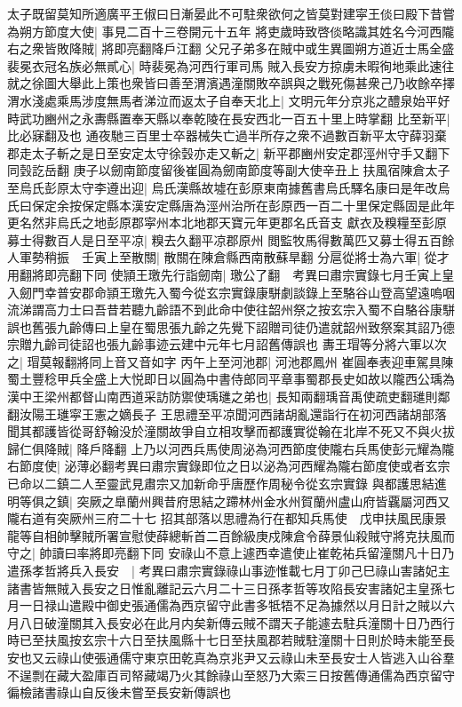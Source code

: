 太子既留莫知所適廣平王俶曰日漸晏此不可駐衆欲何之皆莫對建寜王倓曰殿下昔嘗為朔方節度大使|{
	事見二百十三卷開元十五年}
將吏歲時致啓倓略識其姓名今河西隴右之衆皆敗降賊|{
	將即亮翻降戶江翻}
父兄子弟多在賊中或生異圖朔方道近士馬全盛裴冕衣冠名族必無貳心|{
	時裴冕為河西行軍司馬}
賊入長安方掠虜未暇徇地乘此速往就之徐圖大舉此上策也衆皆曰善至渭濱遇潼關敗卒誤與之戰死傷甚衆己乃收餘卒擇渭水淺處乘馬涉度無馬者涕泣而返太子自奉天北上|{
	文明元年分京兆之醴泉始平好畤武功豳州之永夀縣置奉天縣以奉乾陵在長安西北一百五十里上時掌翻}
比至新平|{
	比必寐翻及也}
通夜馳三百里士卒器械失亡過半所存之衆不過數百新平太守薛羽棄郡走太子斬之是日至安定太守徐瑴亦走又斬之|{
	新平郡豳州安定郡涇州守手又翻下同瑴訖岳翻}
庚子以劒南節度留後崔圓為劒南節度等副大使辛丑上扶風宿陳倉太子至烏氏彭原太守李遵出迎|{
	烏氏漢縣故墟在彭原東南據舊書烏氏驛名康曰是年改烏氏曰保定余按保定縣本漢安定縣唐為涇州治所在彭原西一百二十里保定縣固是此年更名然非烏氏之地彭原郡寜州本北地郡天寶元年更郡名氏音支}
獻衣及糗糧至彭原募士得數百人是日至平凉|{
	糗去久翻平凉郡原州}
閲監牧馬得數萬匹又募士得五百餘人軍勢稍振　壬寅上至散關|{
	散關在陳倉縣西南散蘇旱翻}
分扈從將士為六軍|{
	從才用翻將即亮翻下同}
使頴王璬先行詣劒南|{
	璬公了翻　考異曰肅宗實錄七月壬寅上皇入劒門幸普安郡命頴王璬先入蜀今從玄宗實錄康駢劇談錄上至駱谷山登高望遠嗚咽流涕謂高力士曰吾昔若聽九齡語不到此命中使往韶州祭之按玄宗入蜀不自駱谷康駢誤也舊張九齡傳曰上皇在蜀思張九齡之先覺下詔贈司徒仍遣就韶州致祭案其詔乃德宗贈九齡司徒詔也張九齡事迹云建中元年七月詔舊傳誤也}
夀王瑁等分將六軍以次之|{
	瑁莫報翻將同上音又音如字}
丙午上至河池郡|{
	河池郡鳳州}
崔圓奉表迎車駕具陳蜀土豐稔甲兵全盛上大悦即日以圓為中書侍郎同平章事蜀郡長史如故以隴西公瑀為漢中王梁州都督山南西道采訪防禦使瑀璡之弟也|{
	長知兩翻瑀音禹使疏吏翻璡則鄰翻汝陽王璡寜王憲之嫡長子}
王思禮至平凉聞河西諸胡亂還詣行在初河西諸胡部落聞其都護皆從哥舒翰没於潼關故爭自立相攻擊而都護實從翰在北岸不死又不與火拔歸仁俱降賊|{
	降戶降翻}
上乃以河西兵馬使周泌為河西節度使隴右兵馬使彭元耀為隴右節度使|{
	泌薄必翻考異曰肅宗實錄即位之日以泌為河西耀為隴右節度使或者玄宗已命以二鎮二人至靈武見肅宗又加新命乎唐歷作周秘令從玄宗實錄}
與都護思結進明等俱之鎮|{
	突厥之臯蘭州興昔府思結之蹛林州金水州賀蘭州盧山府皆覊屬河西又隴右道有突厥州三府二十七}
招其部落以思禮為行在都知兵馬使　戊申扶風民康景龍等自相帥擊賊所署宣慰使薛總斬首二百餘級庚戍陳倉令薛景仙殺賊守將克扶風而守之|{
	帥讀曰率將即亮翻下同}
安祿山不意上遽西幸遣使止崔乾祐兵留潼關凡十日乃遣孫孝哲將兵入長安　|{
	考異曰肅宗實錄祿山事迹惟載七月丁卯己巳祿山害諸妃主諸書皆無賊入長安之日惟亂離記云六月二十三日孫孝哲等攻陷長安害諸妃主皇孫七月一日禄山遣殿中御史張通儒為西京留守此書多牴牾不足為據然以月日計之賊以六月八日破潼關其入長安必在此月内矣新傳云賊不謂天子能遽去駐兵潼關十日乃西行時已至扶風按玄宗十六日至扶風縣十七日至扶風郡若賊駐潼關十日則於時未能至長安也又云祿山使張通儒守東京田乾真為京兆尹又云祿山未至長安士人皆逃入山谷羣不逞剽在藏大盈庫百司帑藏竭乃火其餘祿山至怒乃大索三日按舊傳通儒為西京留守徧檢諸書祿山自反後未嘗至長安新傳誤也}
